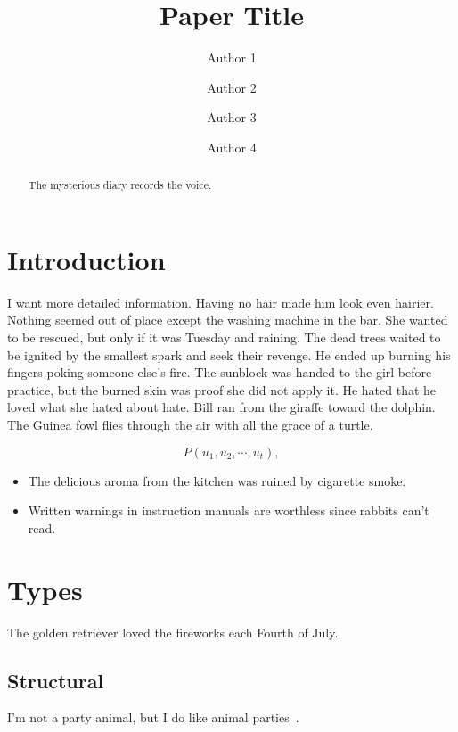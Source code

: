 \documentclass[dea,biber]{now-journal}
\title{Paper Title}
\author[1]{Author 1}
\author[1]{Author 2}
\author[2]{Author 3}
\author[1]{Author 4}
\affil{University 1, USA}
\affil{Institute 1, Singapore}
\begin{document}
\begin{abstract}

    The mysterious diary records the voice.
    
\end{abstract}

\section{Introduction}


    I want more detailed information.
    Having no hair made him look even hairier.
    Nothing seemed out of place except the washing machine in the bar.
    She wanted to be rescued, but only if it was Tuesday and raining.
    The dead trees waited to be ignited by the smallest spark and seek their revenge.
    He ended up burning his fingers poking someone else's fire.
    The sunblock was handed to the girl before practice, but the burned skin was proof she did not apply it.
    He hated that he loved what she hated about hate.
    Bill ran from the giraffe toward the dolphin.
    The Guinea fowl flies through the air with all the grace of a turtle.
    
    
    \begin{equation} \label{eq:lm}
    P(u_1, u_2, \cdots ,u_{t}),
    \end{equation}
    
    \begin{itemize}
    \item The delicious aroma from the kitchen was ruined by cigarette smoke.
    
    \item Written warnings in instruction manuals are worthless since rabbits can't read.
    
    \end{itemize}
    

\section{Types}

    The golden retriever loved the fireworks each Fourth of July.
    
    \subsection{Structural} 
    
        I'm not a party animal, but I do like animal parties~\cite{french1999catastrophic}. 
    
\end{document}
